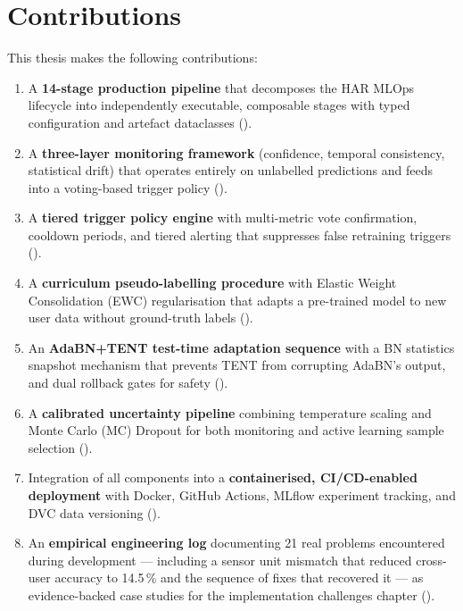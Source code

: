 \section{Contributions}
\label{sec:contributions}

This thesis makes the following contributions:

\begin{enumerate}
  \item A \textbf{14-stage production pipeline} that decomposes the HAR MLOps
        lifecycle into independently executable, composable stages with typed
        configuration and artefact dataclasses
        ().

  \item A \textbf{three-layer monitoring framework} (confidence, temporal
        consistency, statistical drift) that operates entirely on unlabelled
        predictions and feeds into a voting-based trigger policy
        ().

  \item A \textbf{tiered trigger policy engine} with multi-metric vote
        confirmation, cooldown periods, and tiered alerting that suppresses
        false retraining triggers ().

  \item A \textbf{curriculum pseudo-labelling procedure} with Elastic Weight
        Consolidation (EWC) regularisation that adapts a pre-trained model
        to new user data without ground-truth labels
        ().

  \item An \textbf{AdaBN+TENT test-time adaptation sequence} with a BN
        statistics snapshot mechanism that prevents TENT from corrupting
        AdaBN's output, and dual rollback gates for safety
        ().

  \item A \textbf{calibrated uncertainty pipeline} combining temperature
        scaling and Monte Carlo (MC) Dropout for both monitoring and active
        learning sample selection ().

  \item Integration of all components into a \textbf{containerised, CI/CD-enabled
        deployment} with Docker, GitHub Actions, MLflow experiment tracking,
        and DVC data versioning ().

  \item An \textbf{empirical engineering log} documenting 21 real problems
        encountered during development --- including a sensor unit mismatch
        that reduced cross-user accuracy to 14.5\,\% and the sequence of fixes
        that recovered it --- as evidence-backed case studies for the
        implementation challenges chapter ().
\end{enumerate}

